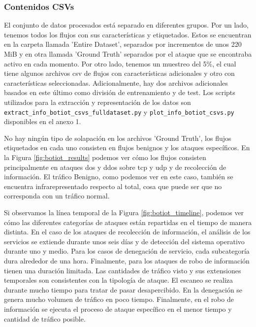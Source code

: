 \subsubsection{Contenidos CSVs}

El conjunto de datos procesados está separado en diferentes grupos. Por un lado, tenemos todos los flujos con sus características y etiquetados. Estos se encuentran en la carpeta llamada 'Entire Dataset', separados por incrementos de unos 220 MiB y en otra llamada 'Ground Truth' separados por  el ataque que se encontraba activo en cada momento. Por otro lado, tenemos un muestreo del 5\%, el cual tiene algunos archivos \acrshort{csv} de flujos con características adicionales y otro con características seleccionadas. Adicionalmente, hay dos archivos adicionales basados en este último como división de entrenamiento y de test. Los scripts utilizados para la extracción y representación de los datos son \texttt{extract\_info\_botiot\_csvs\_fulldataset.py} y \texttt{plot\_info\_botiot\_csvs.py} disponibles en el anexo 1.

No hay ningún tipo de solapación en los archivos 'Ground Truth', los flujos etiquetados en cada uno consisten en flujos benignos y los ataques específicos. En la Figura \ref{fig:botiot_results} podemos ver cómo los flujos consisten principalmente en ataques \acrshort{dos} y \acrshort{ddos} sobre \acrshort{tcp} y \acrshort{udp} y de recolección de información. El tráfico Benigno, como podemos ver en este caso, también se encuentra infrarepresentado respecto al total, cosa que puede ser que no corresponda con un tráfico normal.

Si observamos la línea temporal de la Figura \ref{fig:botiot_timeline}, podemos ver cómo las diferentes categorías de ataques están repartidas en el tiempo de manera distinta. En el caso de los ataques de recolección de información, el análisis de los servicios se extiende durante unos seis días y de detección del sistema operativo durante uno y medio. Para los casos de denegación de servicio, cada subcategoría dura alrededor de una hora. Finalmente, para los ataques de robo de información tienen una duración limitada. Las cantidades de tráfico visto y sus extensiones temporales son consistentes con la tipología de ataque. El escaneo se realiza durante mucho tiempo para tratar de pasar desapercibido. En la denegación se genera mucho volumen de tráfico en poco tiempo. Finalmente, en el robo de información se ejecuta el proceso de ataque específico en el menor tiempo y cantidad de tráfico posible.


